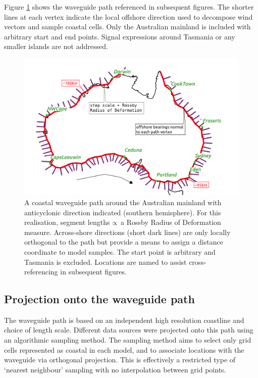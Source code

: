 Figure \ref{fig:CTW_path} shows the waveguide path referenced in subsequent figures.
The shorter lines at each vertex indicate the local offshore direction used to decompose wind vectors and sample coastal cells.
Only the Australian mainland is included with arbitrary start and end points.
Signal expressions around Tasmania or any smaller islands are not addressed. 
\begin{figure}[H]\centering
    \noindent\includegraphics[width=\figwidthHalf]{figures/maps/map_overview.png}
    \caption[Coastal waveguide path around the Australian mainland used for this study.]
            {A coastal waveguide path around the Australian mainland with anticyclonic direction indicated (southern hemisphere).
             For this realisation, segment lengths $\protect\propto$ a Rossby Radius of Deformation measure. 
             Across-shore directions (short dark lines) are only locally orthogonal to the path but provide a means to assign a distance coordinate to model samples. 
             The start point is arbitrary and Tasmania is excluded.
             Locations are named to assist cross-referencing in subsequent figures.}
    \label{fig:CTW_path}
\end{figure}  

\subsection{ Projection onto the waveguide path }

The waveguide path is based on an independent high resolution coastline and choice of length scale.
Different data sources were projected onto this path using an algorithmic sampling method.
The sampling method aims to select only grid cells represented as coastal in each model, and to associate locations with the waveguide via orthogonal projection. 
This is effectively a restricted type of `nearest neighbour' sampling with no interpolation between grid points.

